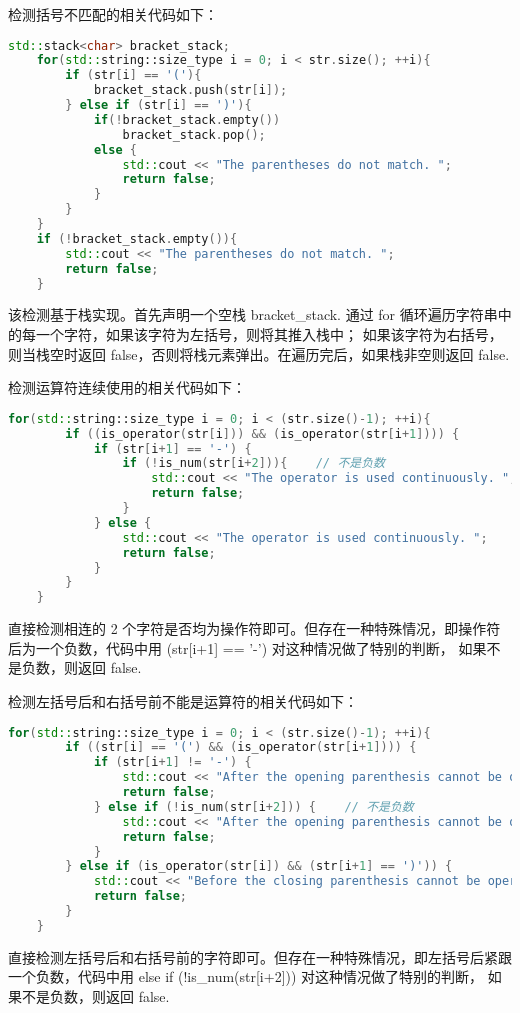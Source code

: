 \documentclass[UTF8]{ctexart}
\begin{document}
检测括号不匹配的相关代码如下：
\begin{lstlisting}[language=c++, breaklines=true, keywordstyle=\color{blue!70}, commentstyle=\color{red!50!green!50!blue!50}, frame=shadowbox, rulesepcolor=\color{red!20!green!20!blue!20}]
    std::stack<char> bracket_stack;
    for(std::string::size_type i = 0; i < str.size(); ++i){
        if (str[i] == '('){ 
            bracket_stack.push(str[i]);
        } else if (str[i] == ')'){ 
            if(!bracket_stack.empty())
                bracket_stack.pop(); 
            else {
                std::cout << "The parentheses do not match. "; 
                return false; 
            }
        }
    }
    if (!bracket_stack.empty()){
        std::cout << "The parentheses do not match. "; 
        return false; 
    }
\end{lstlisting}
该检测基于栈实现。首先声明一个空栈 bracket\_stack. 通过 for 循环遍历字符串中的每一个字符，如果该字符为左括号，则将其推入栈中；
如果该字符为右括号，则当栈空时返回 false，否则将栈元素弹出。在遍历完后，如果栈非空则返回 false. 

检测运算符连续使用的相关代码如下：
\begin{lstlisting}[language=c++, breaklines=true, keywordstyle=\color{blue!70}, commentstyle=\color{red!50!green!50!blue!50}, frame=shadowbox, rulesepcolor=\color{red!20!green!20!blue!20}]
    for(std::string::size_type i = 0; i < (str.size()-1); ++i){
        if ((is_operator(str[i])) && (is_operator(str[i+1]))) {
            if (str[i+1] == '-') { 
                if (!is_num(str[i+2])){    // 不是负数
                    std::cout << "The operator is used continuously. "; 
                    return false; 
                }
            } else {
                std::cout << "The operator is used continuously. "; 
                return false; 
            }
        } 
    }
\end{lstlisting}
直接检测相连的 2 个字符是否均为操作符即可。但存在一种特殊情况，即操作符后为一个负数，代码中用 (str[i+1] == '-') 对这种情况做了特别的判断，
如果不是负数，则返回 false. 

检测左括号后和右括号前不能是运算符的相关代码如下：
\begin{lstlisting}[language=c++, breaklines=true, keywordstyle=\color{blue!70}, commentstyle=\color{red!50!green!50!blue!50}, frame=shadowbox, rulesepcolor=\color{red!20!green!20!blue!20}]
    for(std::string::size_type i = 0; i < (str.size()-1); ++i){
        if ((str[i] == '(') && (is_operator(str[i+1]))) {
            if (str[i+1] != '-') {
                std::cout << "After the opening parenthesis cannot be operators. "; 
                return false; 
            } else if (!is_num(str[i+2])) {    // 不是负数
                std::cout << "After the opening parenthesis cannot be operators. "; 
                return false; 
            }
        } else if (is_operator(str[i]) && (str[i+1] == ')')) {
            std::cout << "Before the closing parenthesis cannot be operators. "; 
            return false; 
        }
    }
\end{lstlisting}
直接检测左括号后和右括号前的字符即可。但存在一种特殊情况，即左括号后紧跟一个负数，代码中用 else if (!is\_num(str[i+2])) 对这种情况做了特别的判断，
如果不是负数，则返回 false. 
\end{document}
